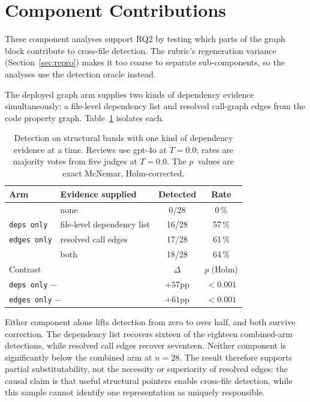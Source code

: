 \section{Component Contributions}
\label{sec:results-ablations}
\label{app:supporting-components}

These component analyses support RQ2 by testing which parts of the graph block
contribute to cross-file detection. The rubric's regeneration variance
(Section~\ref{sec:repro}) makes it too coarse to separate sub-components, so
the analyses use the detection oracle instead.

The deployed graph arm supplies two kinds of dependency evidence
simultaneously: a file-level dependency list and resolved call-graph edges from
the code property graph. Table~\ref{tab:exp2-features} isolates each.

\begin{table}[htbp]
    \centering
    \caption{Detection on structural bands with one kind of dependency
        evidence at a time. Reviews use gpt-4o at $T=0.0$; rates are majority
        votes from five judges at $T=0.0$. The $p$~values are exact McNemar,
        Holm-corrected.}
    \label{tab:exp2-features}
    \begin{tabular}{llcc}
        \toprule
        Arm & Evidence supplied & Detected & Rate \\
        \midrule
        \baseline{}        & none                        & 0/28  & 0\,\% \\
        \texttt{deps only} & file-level dependency list   & 16/28 & 57\,\% \\
        \texttt{edges only}& resolved call edges         & 17/28 & 61\,\% \\
        \kg{}              & both                        & 18/28 & 64\,\% \\
        \midrule
        \multicolumn{2}{l}{Contrast} & $\Delta$ & $p$ (Holm) \\
        \midrule
        \multicolumn{2}{l}{\texttt{deps only} $-$ \baseline{}}  & $+57$pp & $< 0.001$ \\
        \multicolumn{2}{l}{\texttt{edges only} $-$ \baseline{}} & $+61$pp & $< 0.001$ \\
        \bottomrule
    \end{tabular}
\end{table}

Either component alone lifts detection from zero to over half, and both
survive correction. The dependency list recovers sixteen of the eighteen
combined-arm detections, while resolved call edges recover seventeen. Neither
component is significantly below the combined arm at $n=28$. The result
therefore supports partial substitutability, not the necessity or superiority
of resolved edges: the causal claim is that useful structural pointers enable
cross-file detection, while this sample cannot identify one representation as
uniquely responsible.

